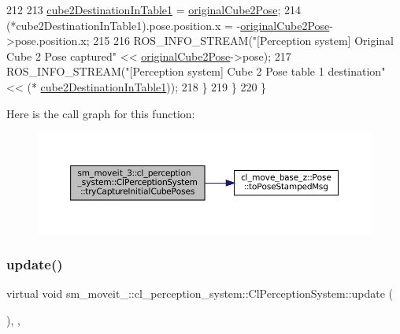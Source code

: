 \begin{DoxyCode}
212 
213         \hyperlink{classsm__moveit__3_1_1cl__perception__system_1_1ClPerceptionSystem_a1aae7fcf13de6c6b6c07dd2b595a5538}{cube2DestinationInTable1} = \hyperlink{classsm__moveit__3_1_1cl__perception__system_1_1ClPerceptionSystem_a71df0282435faa5f108c4fb2d846e90f}{originalCube2Pose};
214         (*cube2DestinationInTable1).pose.position.x = -\hyperlink{classsm__moveit__3_1_1cl__perception__system_1_1ClPerceptionSystem_a71df0282435faa5f108c4fb2d846e90f}{originalCube2Pose}->pose.position.x;
215 
216         ROS\_INFO\_STREAM(\textcolor{stringliteral}{"[Perception system] Original Cube 2 Pose captured"} << 
      \hyperlink{classsm__moveit__3_1_1cl__perception__system_1_1ClPerceptionSystem_a71df0282435faa5f108c4fb2d846e90f}{originalCube2Pose}->pose);
217         ROS\_INFO\_STREAM(\textcolor{stringliteral}{"[Perception system] Cube 2 Pose table 1 destination"} << (*
      \hyperlink{classsm__moveit__3_1_1cl__perception__system_1_1ClPerceptionSystem_a1aae7fcf13de6c6b6c07dd2b595a5538}{cube2DestinationInTable1}));
218       \}
219     \}
220   \}
\end{DoxyCode}
Here is the call graph for this function\+:
\nopagebreak
\begin{figure}[H]
\begin{center}
\leavevmode
\includegraphics[width=350pt]{classsm__moveit__3_1_1cl__perception__system_1_1ClPerceptionSystem_a211e752ccac5163bc775fa426c0d188d_cgraph}
\end{center}
\end{figure}
\mbox{\label{classsm__moveit__3_1_1cl__perception__system_1_1ClPerceptionSystem_a53ce2f7a00275f8c1ce4a0e640bbe3d8}} 
\subsubsection{\texorpdfstring{update()}{update()}}
{\footnotesize\ttfamily virtual void sm\+\_\+moveit\+\_\+::cl\+\_\+perception\+\_\+system\+::\+Cl\+Perception\+System\+::update (\begin{DoxyParamCaption}{ }\end{DoxyParamCaption})\hspace{0.3cm}{\ttfamily [inline]}, {\ttfamily [override]}, {\ttfamily [virtual]}}



